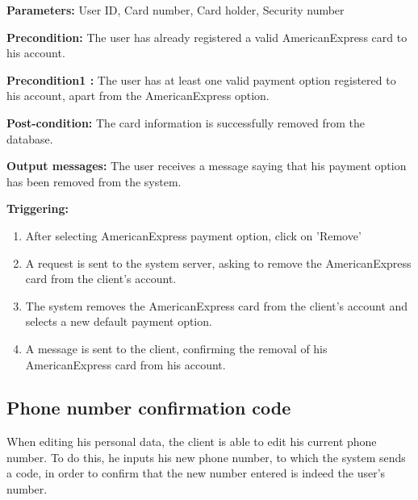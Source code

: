 \begin{description}

\item \textbf{Parameters:} User ID, Card number, Card holder, Security number

\item \textbf{Precondition:} The user has already registered a valid
AmericanExpress card to his account.
\item \textbf{Precondition1 :} The user has at least one valid payment option
registered to his account, apart from the AmericanExpress option.

\item \textbf{Post-condition:} The card information is successfully removed from
the database.

\item \textbf{Output messages:} The user receives a message saying that his
payment option has been removed from the system.

\item \textbf{Triggering:}
\begin{enumerate}
\item After selecting AmericanExpress payment option, click on 'Remove'

\item A request is sent to the system server, asking to remove the AmericanExpress card
from the client's account.

\item The system removes the AmericanExpress card from the client's account and selects a
new default payment option.

\item A message is sent to the client, confirming the removal of his AmericanExpress
card from his account.

\end{enumerate}

\end{description}


\subsection{Phone number confirmation code}

 When editing his personal data, the client is able to edit his current phone
 number. To do this, he inputs his new phone number, to which the system sends a
 code, in order to confirm that the new number entered is indeed the user's
 number.

